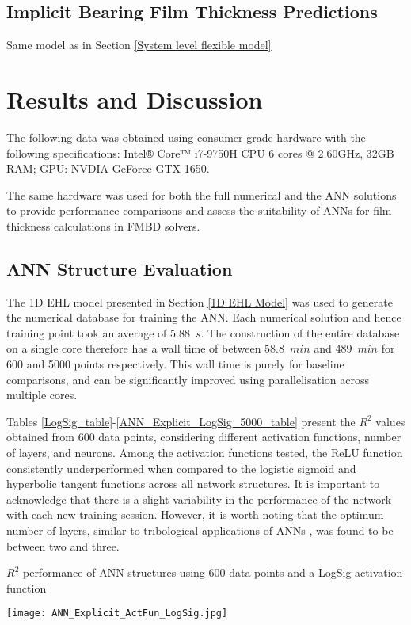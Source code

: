 \subsection{Implicit Bearing Film Thickness Predictions}

Same model as in Section \ref{System level flexible model}



\section{Results and Discussion}

The following data was obtained using consumer grade hardware with the following specifications: 
Intel® Core™ i7-9750H CPU 6 cores @ 2.60GHz, 32GB RAM; GPU: NVDIA GeForce GTX 1650.

The same hardware was used for both the full numerical and the ANN solutions to provide performance comparisons and assess the suitability of ANNs for film thickness calculations in FMBD solvers.

\subsection{ANN Structure Evaluation}

The 1D EHL model presented in Section \ref{1D EHL Model} was used to generate the numerical database for training the ANN. Each numerical solution and hence training point took an average of 5.88~$s$. The construction of the entire database on a single core therefore has a wall time of between 58.8~$min$ and 489~$min$ for 600 and 5000 points respectively. This wall time is purely for baseline comparisons, and can be significantly improved using parallelisation across multiple cores.

Tables \ref{LogSig_table}-\ref{ANN_Explicit_LogSig_5000_table} present the $R^2$ values obtained from 600 data points, considering different activation functions, number of layers, and neurons. Among the activation functions tested, the ReLU function consistently underperformed when compared to the logistic sigmoid and hyperbolic tangent functions across all network structures. It is important to acknowledge that there is a slight variability in the performance of the network with each new training session. However, it is worth noting that the optimum number of layers, similar to tribological applications of ANNs \cite{Marian2021}, was found to be between two and three.


\begin{table}
	\caption{$R^2$ performance of ANN structures using 600 data points and a LogSig activation function}
	\label{LogSig_table}
	\texttt{[image: ANN\_Explicit\_ActFun\_LogSig.jpg]}
\end{table}

